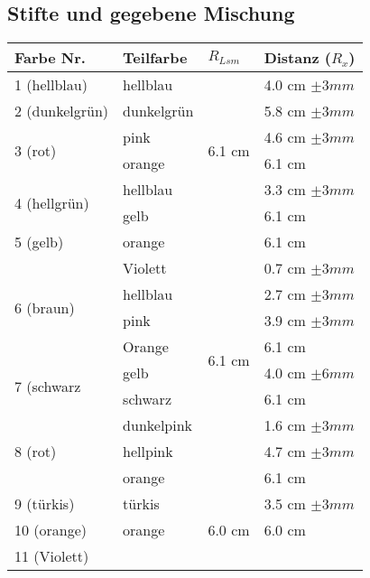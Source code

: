 \documentclass[11pt,paper=a4,final]{scrartcl}
\begin{document}
\subsection{Stifte und gegebene Mischung}
\begin{savenotes} %
  \begin{table}[ht]
    \centering
    \begin{tabular}{|l|l|l|l|}
      \hline
    \bf Farbe Nr.	& \bf Teilfarbe	& \bf \(R_{Lsm}\)		& \bf Distanz (\(R_x\))	\\ \hline
      1 (hellblau)	& hellblau	& \multirow{6}{*}{6.1 cm }	& 4.0 cm \(\pm 3 mm \)	\\ \cline{1-2} \cline{4-4}
      2 (dunkelgr\"un)	& dunkelgr\"un	&				& 5.8 cm \(\pm 3 mm \)	\\ \cline{1-2} \cline{4-4}
      \multirow{2}{*}{3 (rot) }
			& pink		&				& 4.6 cm \(\pm 3 mm \)	\\ 
			& orange	&				& 6.1 cm 		\\ \cline{1-2} \cline{4-4}
      \multirow{2}{*}{4 (hellgr\"un) }
 			& hellblau	&				& 3.3 cm \(\pm 3 mm \)	\\
			& gelb		&				& 6.1 cm		\\ \hline
      5 (gelb)		& orange	& \multirow{10}{*}{6.1 cm }	& 6.1 cm		\\ \cline{1-2} \cline{4-4}
      \multirow{4}{*}{6 (braun)}
			& Violett	&				& 0.7 cm \(\pm 3 mm \)	\\
			& hellblau	&				& 2.7 cm \(\pm 3 mm \)	\\
      			& pink		&				& 3.9 cm \(\pm 3 mm \)	\\
      			& Orange	&				& 6.1 cm 		\\ \cline{1-2} \cline{4-4}
      \multirow{2}{*}{7 (schwarz}
      			& gelb		&				& 4.0 cm \(\pm 6 mm \)	\\
      			& schwarz	&				& 6.1 cm		\\ \cline{1-2} \cline{4-4}
      \multirow{3}{*}{8 (rot)}
      			& dunkelpink	& 				& 1.6 cm \(\pm 3 mm \)	\\ 
      			& hellpink	&				& 4.7 cm \(\pm 3 mm \)	\\
      			& orange	&				& 6.1 cm		\\ \hline
      9 (t\"urkis)	& t\"urkis	& \multirow{6}{*}{6.0 cm }	& 3.5 cm \(\pm 3 mm \)	\\ \cline{1-2} \cline{4-4}
       10 (orange)	& orange	& 				& 6.0 cm		\\ \cline{1-2} \cline{4-4}
      \multirow{3}{*}{11 (Violett)}

\end{tabular}
\end{table}
\end{savenotes}
\end{document}
